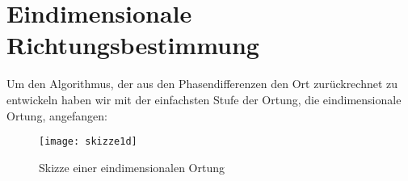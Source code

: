   \section{Eindimensionale Richtungsbestimmung} 
  Um den Algorithmus, der aus den Phasendifferenzen den Ort zurückrechnet zu entwickeln haben wir mit der
einfachsten Stufe der Ortung, die eindimensionale Ortung, angefangen:
    \begin{figure}
        \centering
        \texttt{[image: skizze1d]}
        \caption{Skizze einer eindimensionalen Ortung}
    \end{figure}
